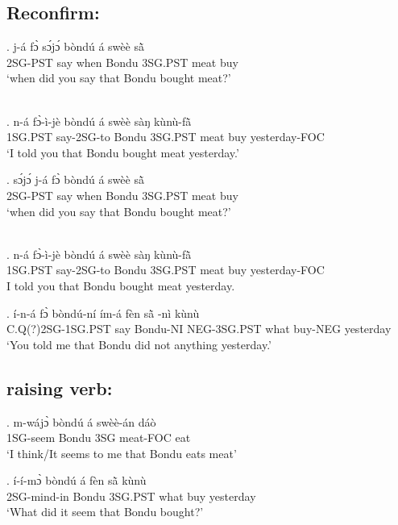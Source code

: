 \documentclass{assets/fieldnotes}
\begin{document}

\subsection{Reconfirm:}

\exg. j-á fɔ̀ sɔ́jɔ́ bòndú á swèè sã̀ \\
2SG-PST say when Bondu 3SG.PST meat buy\\
`when did you say that Bondu bought meat?' 

\\

\exg. n-á fɔ̀-ì-jè bòndú á swèè sàŋ kùnù-fã̀\\
1SG.PST say-2SG-to Bondu 3SG.PST meat buy yesterday-FOC\\
`I told you that Bondu bought meat yesterday.'

\exg. sɔ́jɔ́ j-á fɔ̀ bòndú á swèè sã̀ \\
2SG-PST say when Bondu 3SG.PST meat buy\\
`when did you say that Bondu bought meat?' 

\\

\exg. n-á fɔ̀-ì-jè bòndú á swèè sàŋ kùnù-fã̀\\
1SG.PST say-2SG-to Bondu 3SG.PST meat buy yesterday-FOC\\
I told you that Bondu bought meat yesterday. 


\exg. í-n-á fɔ̀ bòndú-ní ím-á fèn sã̀ -nì kùnù\\
C.Q(?)2SG-1SG.PST say Bondu-NI NEG-3SG.PST what buy-NEG yesterday\\
`You told me that Bondu did not anything yesterday.' 


\subsection{raising verb:}

\exg. m-wájɔ̀ bòndú á swèè-án dáò\\
1SG-seem Bondu 3SG meat-FOC eat \\
`I think/It seems to me that Bondu eats meat' 

\exg. í-í-mɔ̀ bòndú á fèn sã̀  kùnù \\
2SG-mind-in Bondu 3SG.PST what buy yesterday\\
`What did it seem that Bondu bought?' 
\end{document}
